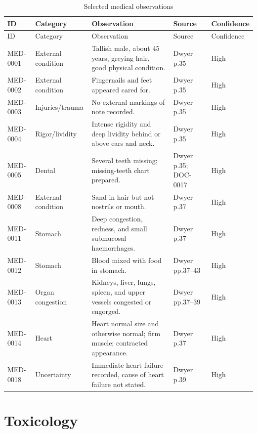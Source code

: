 \begingroup
\scriptsize
\setlength{\tabcolsep}{2pt}
\renewcommand{\arraystretch}{1.12}
\begin{longtable}{>{\raggedright\arraybackslash}p{}>{\raggedright\arraybackslash}p{}>{\raggedright\arraybackslash}p{}>{\raggedright\arraybackslash}p{}>{\raggedright\arraybackslash}p{}}
\caption{Selected medical observations}\label{tab:chapter9-medical-observations}\\
\toprule
ID & Category & Observation & Source & Confidence \\
\midrule
\endfirsthead
\toprule
ID & Category & Observation & Source & Confidence \\
\midrule
\endhead
MED-0001 & External condition & Tallish male, about 45 years, greying hair, good physical condition. & Dwyer p.35 & High \\
MED-0002 & External condition & Fingernails and feet appeared cared for. & Dwyer p.35 & High \\
MED-0003 & Injuries/trauma & No external markings of note recorded. & Dwyer p.35 & High \\
MED-0004 & Rigor/lividity & Intense rigidity and deep lividity behind or above ears and neck. & Dwyer p.35 & High \\
MED-0005 & Dental & Several teeth missing; missing-teeth chart prepared. & Dwyer p.35; DOC-0017 & High \\
MED-0008 & External condition & Sand in hair but not nostrils or mouth. & Dwyer p.37 & High \\
MED-0011 & Stomach & Deep congestion, redness, and small submucosal haemorrhages. & Dwyer p.37 & High \\
MED-0012 & Stomach & Blood mixed with food in stomach. & Dwyer pp.37--43 & High \\
MED-0013 & Organ congestion & Kidneys, liver, lungs, spleen, and upper vessels congested or engorged. & Dwyer pp.37--39 & High \\
MED-0014 & Heart & Heart normal size and otherwise normal; firm muscle; contracted appearance. & Dwyer p.37 & High \\
MED-0018 & Uncertainty & Immediate heart failure recorded, cause of heart failure not stated. & Dwyer p.39 & High \\
\bottomrule
\end{longtable}
\endgroup

\section{Toxicology}

